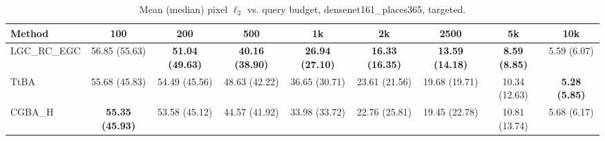 \begin{table}[t]
\centering\footnotesize
\caption{Mean (median) pixel $\ell_2$ vs. query budget, densenet161\_places365, targeted.}
\begin{tabular}{lcccccccc}
\toprule
Method & 100 & 200 & 500 & 1k & 2k & 2500 & 5k & 10k \\
\midrule
LGC\_RC\_EGC & 56.85 (55.63) & \textbf{51.04 (49.63)} & \textbf{40.16 (38.90)} & \textbf{26.94 (27.10)} & \textbf{16.33 (16.35)} & \textbf{13.59 (14.18)} & \textbf{8.59 (8.85)} & 5.59 (6.07) \\
TtBA & 55.68 (45.83) & 54.49 (45.56) & 48.63 (42.22) & 36.65 (30.71) & 23.61 (21.56) & 19.68 (19.71) & 10.34 (12.63) & \textbf{5.28 (5.85)} \\
CGBA\_H & \textbf{55.35 (45.93)} & 53.58 (45.12) & 44.57 (41.92) & 33.98 (33.72) & 22.76 (25.81) & 19.45 (22.78) & 10.81 (13.74) & 5.68 (6.17) \\
\bottomrule
\end{tabular}
\end{table}
